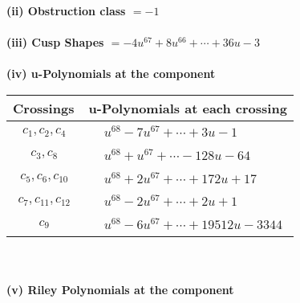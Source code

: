\documentclass[1p]{elsarticle_modified}
\theoremstyle{definition}
\begin{document}
\flushleft \textbf{(ii) Obstruction class $= -1$}\\~\\
\flushleft \textbf{(iii) Cusp Shapes $= -4 u^{67}+8 u^{66}+\cdots+36 u-3$}\\~\\
\newpage\renewcommand{\arraystretch}{1}
\flushleft \textbf{(iv) u-Polynomials at the component}\newline \\
\begin{tabular}{m{50pt}|m{274pt}}
Crossings & \hspace{64pt}u-Polynomials at each crossing \\
\hline $$\begin{aligned}c_{1},c_{2},c_{4}\end{aligned}$$&$\begin{aligned}
&u^{68}-7 u^{67}+\cdots+3 u-1
\end{aligned}$\\
\hline $$\begin{aligned}c_{3},c_{8}\end{aligned}$$&$\begin{aligned}
&u^{68}+u^{67}+\cdots-128 u-64
\end{aligned}$\\
\hline $$\begin{aligned}c_{5},c_{6},c_{10}\end{aligned}$$&$\begin{aligned}
&u^{68}+2 u^{67}+\cdots+172 u+17
\end{aligned}$\\
\hline $$\begin{aligned}c_{7},c_{11},c_{12}\end{aligned}$$&$\begin{aligned}
&u^{68}-2 u^{67}+\cdots+2 u+1
\end{aligned}$\\
\hline $$\begin{aligned}c_{9}\end{aligned}$$&$\begin{aligned}
&u^{68}-6 u^{67}+\cdots+19512 u-3344
\end{aligned}$\\
\hline
\end{tabular}\\~\\
\newpage\renewcommand{\arraystretch}{1}
\flushleft \textbf{(v) Riley Polynomials at the component}\newline \\
\end{document}
